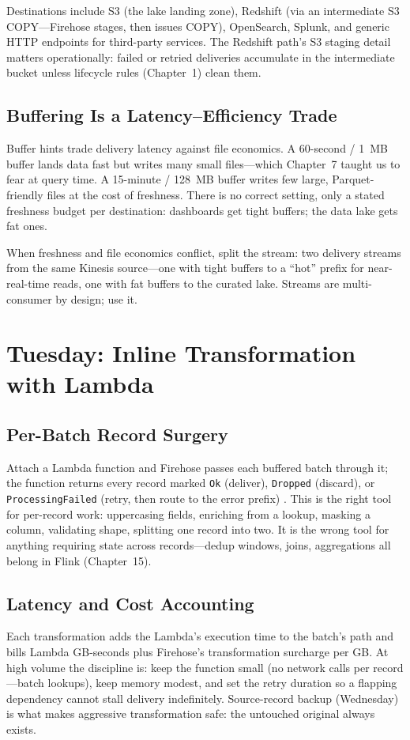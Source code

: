 Destinations include S3 (the lake landing zone), Redshift (via an intermediate S3 COPY---Firehose stages, then issues COPY), OpenSearch, Splunk, and generic HTTP endpoints for third-party services. The Redshift path's S3 staging detail matters operationally: failed or retried deliveries accumulate in the intermediate bucket unless lifecycle rules (Chapter~1) clean them.

\subsection{Buffering Is a Latency--Efficiency Trade}
Buffer hints trade delivery latency against file economics. A 60-second / 1~MB buffer lands data fast but writes many small files---which Chapter~7 taught us to fear at query time. A 15-minute / 128~MB buffer writes few large, Parquet-friendly files at the cost of freshness. There is no correct setting, only a stated freshness budget per destination: dashboards get tight buffers; the data lake gets fat ones.

\begin{tipbox}
When freshness and file economics conflict, split the stream: two delivery streams from the same Kinesis source---one with tight buffers to a ``hot'' prefix for near-real-time reads, one with fat buffers to the curated lake. Streams are multi-consumer by design; use it.
\end{tipbox}

\section{Tuesday: Inline Transformation with Lambda}
\subsection{Per-Batch Record Surgery}
Attach a Lambda function and Firehose passes each buffered batch through it; the function returns every record marked \texttt{Ok} (deliver), \texttt{Dropped} (discard), or \texttt{ProcessingFailed} (retry, then route to the error prefix) \cite{awsFirehoseDocs,awsLambdaDocs}. This is the right tool for per-record work: uppercasing fields, enriching from a lookup, masking a column, validating shape, splitting one record into two. It is the wrong tool for anything requiring state across records---dedup windows, joins, aggregations all belong in Flink (Chapter~15).

\subsection{Latency and Cost Accounting}
Each transformation adds the Lambda's execution time to the batch's path and bills Lambda GB-seconds plus Firehose's transformation surcharge per GB. At high volume the discipline is: keep the function small (no network calls per record---batch lookups), keep memory modest, and set the retry duration so a flapping dependency cannot stall delivery indefinitely. Source-record backup (Wednesday) is what makes aggressive transformation safe: the untouched original always exists.

